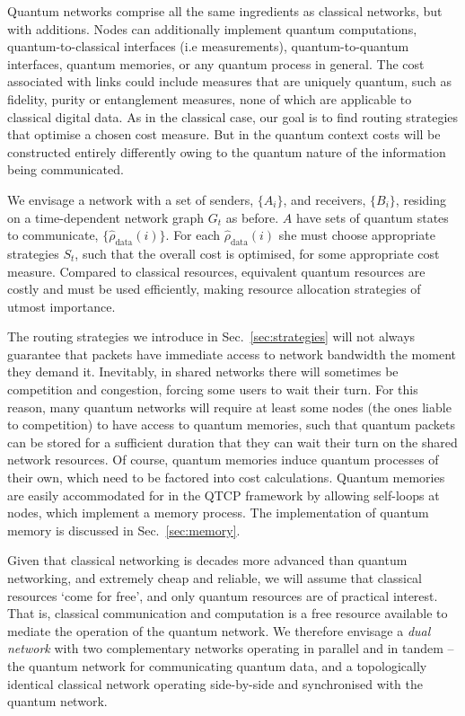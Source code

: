 \documentclass[aps,rmp,twocolumn,amsmath,amssymb,nofootinbib,superscriptaddress,longbibliography,floatfix]{revtex4-1}
\begin{document}
Quantum networks comprise all the same ingredients as classical networks, but with additions. Nodes can additionally implement quantum computations, quantum-to-classical interfaces (i.e measurements), quantum-to-quantum interfaces, quantum memories, or any quantum process in general. The cost associated with links could include measures that are uniquely quantum, such as fidelity, purity or entanglement measures, none of which are applicable to classical digital data. As in the classical case, our goal is to find routing strategies that optimise a chosen cost measure. But in the quantum context costs will be constructed entirely differently owing to the quantum nature of the information being communicated.

We envisage a network with a set of senders, $\{A_i\}$, and receivers, $\{B_i\}$, residing on a time-dependent network graph $G_t$ as before. $A$ have sets of quantum states to communicate, $\{\hat\rho_\mathrm{data}(i)\}$. For each $\hat\rho_\mathrm{data}(i)$ she must choose appropriate strategies $S_t$, such that the overall cost is optimised, for some appropriate cost measure. Compared to classical resources, equivalent quantum resources are costly and must be used efficiently, making resource allocation strategies of utmost importance.

The routing strategies we introduce in Sec.~\ref{sec:strategies} will not always guarantee that packets have immediate access to network bandwidth the moment they demand it. Inevitably, in shared networks there will sometimes be competition and congestion, forcing some users to wait their turn. For this reason, many quantum networks will require at least some nodes (the ones liable to competition) to have access to quantum memories, such that quantum packets can be stored for a sufficient duration that they can wait their turn on the shared network resources. Of course, quantum memories induce quantum processes of their own, which need to be factored into cost calculations. Quantum memories are easily accommodated for in the QTCP framework by allowing self-loops at nodes, which implement a memory process. The implementation of quantum memory is discussed in Sec.~\ref{sec:memory}.

Given that classical networking is decades more advanced than quantum networking, and extremely cheap and reliable, we will assume that classical resources `come for free', and only quantum resources are of practical interest. That is, classical communication and computation is a free resource available to mediate the operation of the quantum network. We therefore envisage a \emph{dual network} with two complementary networks operating in parallel and in tandem -- the quantum network for communicating quantum data, and a topologically identical classical network operating side-by-side and synchronised with the quantum network.
\end{document}
